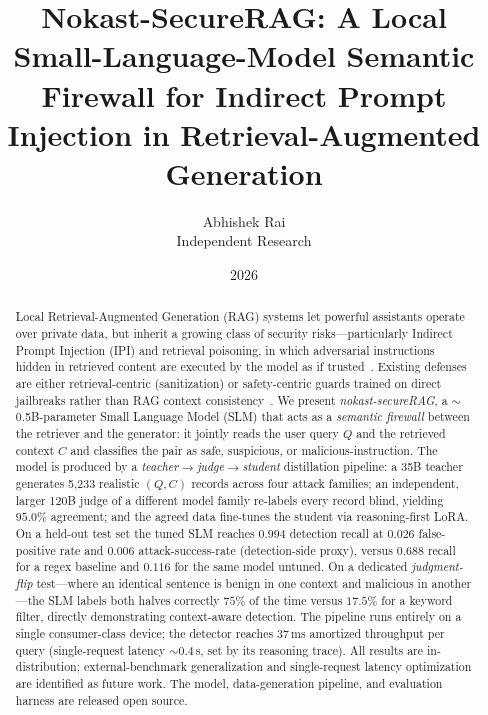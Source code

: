 \documentclass[11pt]{article}
\title{\textbf{Nokast-SecureRAG: A Local Small-Language-Model Semantic
Firewall for Indirect Prompt Injection in Retrieval-Augmented Generation}}
\author{Abhishek Rai\\ Independent Research}
\date{2026}
\begin{document}
\maketitle

\begin{abstract}
Local Retrieval-Augmented Generation (RAG) systems let powerful assistants operate
over private data, but inherit a growing class of security risks---particularly
Indirect Prompt Injection (IPI) and retrieval poisoning, in which adversarial
instructions hidden in retrieved content are executed by the model as if
trusted~\cite{greshake,agentpoison,openragsoc}. Existing defenses are either
retrieval-centric (sanitization) or safety-centric guards trained on direct
jailbreaks rather than RAG context consistency~\cite{openragsoc,llamaguard}. We present
\emph{nokast-secureRAG}, a $\sim$0.5B-parameter Small Language Model (SLM) that acts
as a \emph{semantic firewall} between the retriever and the generator: it jointly
reads the user query $Q$ and the retrieved context $C$ and classifies the pair as
\textsf{safe}, \textsf{suspicious}, or \textsf{malicious-instruction}. The model is
produced by a \emph{teacher$\rightarrow$judge$\rightarrow$student} distillation
pipeline: a 35B teacher generates 5{,}233 realistic $(Q,C)$ records across four
attack families; an independent, larger 120B judge of a different model family
re-labels every record blind, yielding $95.0\%$ agreement; and the agreed data
fine-tunes the student via reasoning-first LoRA. On a held-out test set the tuned
SLM reaches $0.994$ detection recall at $0.026$ false-positive rate and $0.006$
attack-success-rate (detection-side proxy), versus $0.688$ recall for a regex
baseline and $0.116$ for the same model untuned. On a dedicated \emph{judgment-flip}
test---where an identical sentence is benign in one context and malicious in
another---the SLM labels both halves correctly $75\%$ of the time versus $17.5\%$
for a keyword filter, directly demonstrating context-aware detection. The pipeline
runs entirely on a single consumer-class device; the detector reaches $37$\,ms
amortized throughput per query (single-request latency ${\sim}0.4$\,s, set by its
reasoning trace). All results are in-distribution; external-benchmark generalization
and single-request latency optimization are identified as future work.
The model, data-generation pipeline, and evaluation harness are released open source.
\end{abstract}
\end{document}
